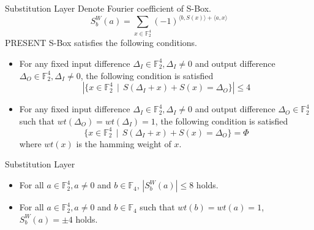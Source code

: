 \begin{frame}{Substitution Layer}
    Denote Fourier coefficient of S-Box.
    \begin{equation}
        S_b^W (a) = \sum_{x \in \mathbb{F}_2^4} (-1)^{\langle b,S(x)\rangle + \langle a,x\rangle}
    \end{equation}
     PRESENT S-Box satisfies the following conditions.
    \begin{itemize}
        \item For any fixed input difference $\Delta_I \in \mathbb{F}_2^4,\Delta_I \not = 0$ and output difference $\Delta_O \in \mathbb{F}_2^4,\Delta_I \not = 0$, the following condition is satisfied
        \begin{equation*}
            |\{ x \in \mathbb{F}_2^4~~ \vert~~ S(\Delta_I +x) + S(x) = \Delta_O \}| \leq 4
        \end{equation*}
        \item For any fixed input difference $\Delta_I \in \mathbb{F}_2^4,\Delta_I \not = 0$ and output difference $\Delta_O \in \mathbb{F}_2^4$ such that $wt(\Delta_O) = wt(\Delta_I) = 1$, the following condition is satisfied
        \begin{equation*}
            \{ x \in \mathbb{F}_2^4~~ \vert~~  S(\Delta_I +x) + S(x) = \Delta_O  \} = \Phi
        \end{equation*}
        where $wt(x)$ is the hamming weight of $x$.
    \end{itemize}
\end{frame}


\begin{frame}{Substitution Layer}
    \begin{itemize}
        \item For all $a \in \mathbb{F}_2^4, a \not = 0 $ and $b \in \mathbb{F}_4$, $|S_b^W (a)| \leq 8$ holds.
        \item For all $a \in \mathbb{F}_2^4, a \not = 0 $ and $b \in \mathbb{F}_4$ such that $wt(b) = wt(a) = 1$, $S_b^W (a) = \pm 4 $ holds.
    \end{itemize}
\end{frame}



